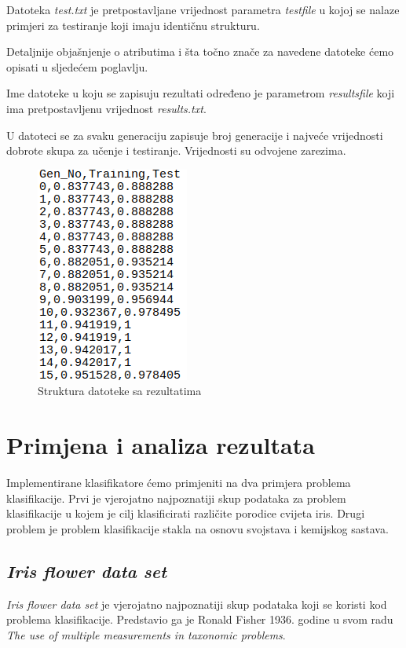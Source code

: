 \documentclass[times, utf8, zavrsni]{fer}
\begin{document}
Datoteka \textit{test.txt} je pretpostavljane vrijednost parametra \textit{testfile} u kojoj se nalaze primjeri za testiranje koji imaju identičnu strukturu.

Detaljnije objašnjenje o atributima i šta točno znače za navedene datoteke ćemo opisati u sljedećem poglavlju.

Ime datoteke u koju se zapisuju rezultati određeno je parametrom \textit{resultsfile} koji ima pretpostavljenu vrijednost \textit{results.txt}.

U datoteci se za svaku generaciju zapisuje broj generacije i najveće vrijednosti dobrote skupa za učenje i testiranje. Vrijednosti su odvojene zarezima.

\begin{figure}[htb]
\centering
\includegraphics[scale=0.6]{images/rezultati}
\caption{Struktura datoteke sa rezultatima}
\end{figure}



\chapter{Primjena i analiza rezultata}

Implementirane klasifikatore ćemo primjeniti na dva primjera problema klasifikacije. Prvi je vjerojatno najpoznatiji skup podataka za problem klasifikacije u kojem je cilj klasificirati različite porodice cvijeta iris. Drugi problem je problem klasifikacije stakla na osnovu svojstava i kemijskog sastava.

\section{\textit{Iris flower data set}}

\textit{Iris flower data set} je vjerojatno najpoznatiji skup podataka koji se koristi kod problema klasifikacije. Predstavio ga je Ronald Fisher 1936. godine u svom radu \textit{The use of multiple measurements in taxonomic problems}.
\end{document}
